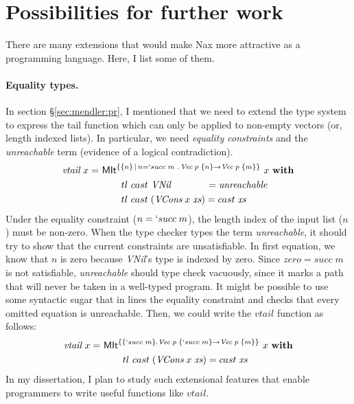 \section{Possibilities for further work}\label{sec:ext}
There are many extensions that would make Nax more attractive
as a programming language. Here, I list some of them.





\paragraph{Equality types.}
In section \S\ref{sec:mendler:pr}, I mentioned that we 
need to extend the type system to express the tail function which can only 
be applied to non-empty vectors (or, length indexed lists).
In particular, we need \emph{equality constraints} and
the \emph{unreachable} term (evidence of a logical contradiction).
\begin{align*}
\textit{vtail}~x =~& \textsf{MIt}^{\{\{n\} \,|\, n=`succ\;m \; . \, \textit{Vec}\;p\;\{n\} -> \textit{Vec}\;p\;\{m\}\}}~x~\textbf{with}\\
&\qquad  tl ~cast~\textit{VNil}~~~~~~~~~~~ = \textit{unreachable} \\
&\qquad  tl ~cast\;(\textit{VCons}\;x\;\textit{xs}) = cast\;\textit{xs}
\end{align*}
Under the equality constraint ($n=`succ\;m$), the length index of
the input list ($n$) must be non-zero. When the type checker types
the term \textit{unreachable}, it should try to show that the current
constraints are unsatisfiable. In first equation, we know that $n$ is zero
because \textit{VNil}'s type is indexed by zero. Since $zero=succ\;m$ is not
satisfiable, \textit{unreachable} should type check vacuously, since it marks
a path that will never be taken in a well-typed program. It might be possible
to use some syntactic sugar that in lines the equality constraint and
checks that every omitted equation is unreachable. Then, we could write
the $vtail$ function as follows:
\begin{align*}
\textit{vtail}~x =~& \textsf{MIt}^{\{ \{`succ\;m\}. \textit{Vec}\;p\;\{`succ\;m\} -> \textit{Vec}\;p\;\{m\}\}}~x~\textbf{with}\\
&\qquad  tl ~cast\;(\textit{VCons}\;x\;\textit{xs}) = cast\;\textit{xs}
\end{align*}
In my dissertation, I plan to study such extensional features that enable
programmers to write useful functions like $vtail$.


